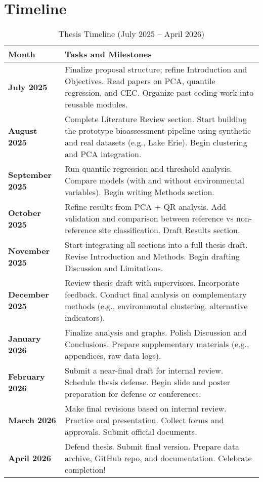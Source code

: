 \section{Timeline}

\begin{table}[!ht]
\centering
\caption{Thesis Timeline (July 2025 – April 2026)}
\renewcommand{\arraystretch}{1.4}
\begin{tabularx}{\textwidth}{>{\bfseries}l X}
\hline
\textbf{Month} & \textbf{Tasks and Milestones} \\
\hline
\textbf{July 2025} & 
Finalize proposal structure; refine Introduction and Objectives. Read papers on PCA, quantile regression, and CEC. Organize past coding work into reusable modules. \\

\textbf{August 2025} & 
Complete Literature Review section. Start building the prototype bioassessment pipeline using synthetic and real datasets (e.g., Lake Erie). Begin clustering and PCA integration. \\

\textbf{September 2025} & 
Run quantile regression and threshold analysis. Compare models (with and without environmental variables). Begin writing Methods section. \\

\textbf{October 2025} & 
Refine results from PCA + QR analysis. Add validation and comparison between reference vs non-reference site classification. Draft Results section. \\

\textbf{November 2025} & 
Start integrating all sections into a full thesis draft. Revise Introduction and Methods. Begin drafting Discussion and Limitations. \\

\textbf{December 2025} & 
Review thesis draft with supervisors. Incorporate feedback. Conduct final analysis on complementary methods (e.g., environmental clustering, alternative indicators). \\

\textbf{January 2026} & 
Finalize analysis and graphs. Polish Discussion and Conclusions. Prepare supplementary materials (e.g., appendices, raw data logs). \\

\textbf{February 2026} & 
Submit a near-final draft for internal review. Schedule thesis defense. Begin slide and poster preparation for defense or conferences. \\

\textbf{March 2026} & 
Make final revisions based on internal review. Practice oral presentation. Collect forms and approvals. Submit official documents. \\

\textbf{April 2026} & 
Defend thesis. Submit final version. Prepare data archive, GitHub repo, and documentation. Celebrate completion! \\
\hline
\end{tabularx}
\end{table}